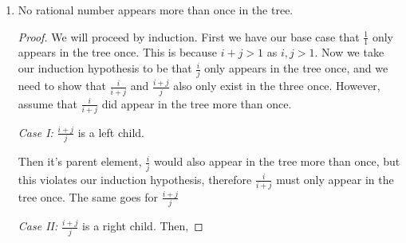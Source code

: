 \documentclass[11pt, leqno]{article}
\begin{document}
\begin{enumerate}
\begin{enumerate}[label=(\alph*)]
\begin{proof}
		\begin{center}
		\begin{forest}
		[$\frac{p}{q - p}$
			[$\frac{p}{q}$]
			[$\frac{q}{q - p}$]
		]
		\end{forest}
		\end{center}
		However, this poses a contradiction as $\frac{p}{q - p}$ is then also not in the tree, but $q - p < q$ and we defined $q$ to the lowest denominator of any rational number that did not exist on the tree. Therefore $\frac{p}{q - p}$ must exist on the tree after all, implying that $\frac{p}{q}$ exists in the tree as well.
		
		\textit{Case II: } $\frac{p}{q}$ is a right child. Then,
		
		\begin{center}
		\begin{forest}
		[$\frac{p - q}{q}$
			[$\frac{p - q}{p}$]
			[$\frac{p}{q}$]
		]
		\end{forest}
		\end{center}
		Once again, we find a contradiction as $\frac{p - q}{q}$ must not be in the tree, but $p - q < p$ and we defined $p$ to be the lowest numerator of any rational number with denominator $q$. However, $\frac{p - q}{q}$ also has denominator $q$ and has a smaller numerator, thus $\frac{p - q}{q}$ exists in the tree and so much $\frac{p}{q}$.
		\end{proof}
		
		\item No rational number appears more than once in the tree.
		
		\begin{proof}
		We will proceed by induction. First we have our base case that $\frac{1}{1}$ only appears in the tree once. This is because $i + j > 1$ as $i, j > 1$. Now we take our induction hypothesis to be that $\frac{i}{j}$ only appears in the tree once, and we need to show that $\frac{i}{i + j}$ and $\frac{i + j}{j}$ also only exist in the three once. However, assume that $\frac{i}{i + j}$ did appear in the tree more than once.
		
		\textit{Case I: } $\frac{i + j}{j}$ is a left child.
		
		Then it's parent element, $\frac{i}{j}$ would also appear in the tree more than once, but this violates our induction hypothesis, therefore $\frac{i}{i + j}$ must only appear in the tree once. The same goes for $\frac{i + j}{j}$
		
		\textit{Case II: } $\frac{i + j}{j}$ is a right child. Then,
		

\end{proof}
\end{enumerate}
\end{enumerate}
\end{document}

